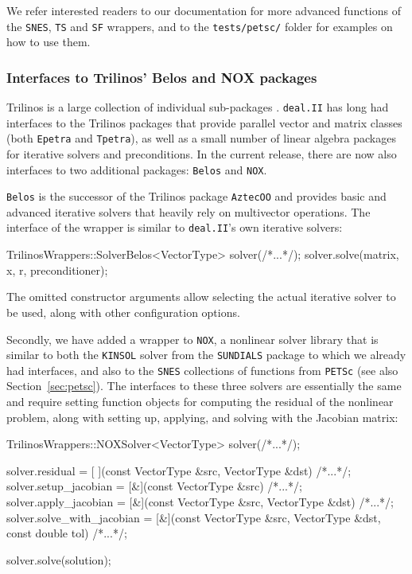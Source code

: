 \documentclass{ansarticle-preprint}
\newcommand{\specialword}[1]{\texttt{#1}}
\newcommand{\dealii}{{\specialword{deal.II}}\xspace}
\newcommand{\snes}{{\specialword{SNES}}\xspace}
\newcommand{\ts}{{\specialword{TS}}\xspace}
\newcommand{\petscsf}{{\specialword{SF}}\xspace}
\begin{document}
We refer interested readers to our documentation for more advanced
functions of the \snes, \ts and \petscsf wrappers, and to the {\tt tests/petsc/} folder
for examples on how to use them.


\subsubsection{Interfaces to Trilinos' Belos and NOX packages}\label{sec:trilinos}

Trilinos is a large collection of individual sub-packages \cite{heroux2005trilinos,trilinos-web-page}. \dealii{}
has long had interfaces to the Trilinos packages that provide parallel
vector and matrix classes (both \texttt{Epetra} and \texttt{Tpetra}),
as well as a small number of linear algebra packages for iterative
solvers and preconditions. In the current release, there are now also
interfaces to two additional packages: \texttt{Belos} and \texttt{NOX}.

\texttt{Belos} is the
successor of the Trilinos package \texttt{AztecOO} and provides basic and advanced iterative solvers
that heavily rely on multivector operations. The interface of the
wrapper is similar to \dealii{}'s own iterative solvers:
\begin{c++}
TrilinosWrappers::SolverBelos<VectorType> solver(/*...*/);
solver.solve(matrix, x, r, preconditioner);
\end{c++}
The omitted constructor arguments allow selecting the actual iterative
solver to be used, along with other configuration options.

Secondly, we have added a wrapper to \texttt{NOX}, a
nonlinear solver library that is similar to both the \texttt{KINSOL} solver from
the \texttt{SUNDIALS} package to which we already had interfaces, and also
to the \texttt{SNES} collections of functions from \texttt{PETSc} (see also
Section~\ref{sec:petsc}). The interfaces to these three solvers are
essentially the same and require setting function objects for
computing the residual of the nonlinear problem, along with setting
up, applying, and solving with the Jacobian matrix:
\begin{c++}
TrilinosWrappers::NOXSolver<VectorType> solver(/*...*/);

solver.residual            = [ ](const VectorType &src,
                                 VectorType       &dst) {/*...*/};
solver.setup_jacobian      = [&](const VectorType &src) {/*...*/};
solver.apply_jacobian      = [&](const VectorType &src,
                                 VectorType       &dst) {/*...*/};
solver.solve_with_jacobian = [&](const VectorType &src,
                                 VectorType       &dst,
                                 const double      tol) {/*...*/};

solver.solve(solution);
\end{c++}
\end{document}
